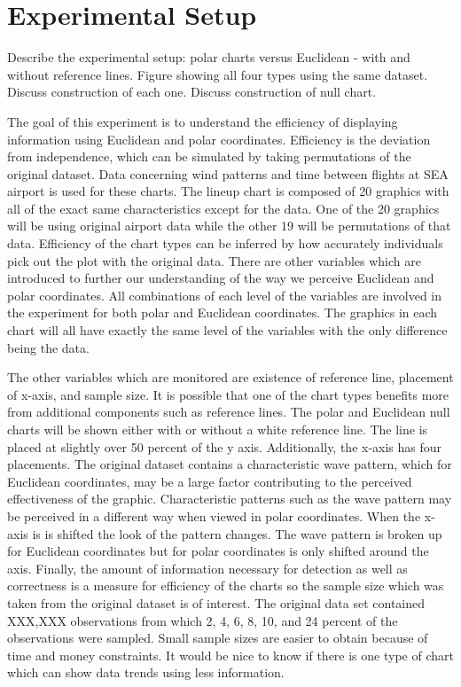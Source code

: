 \section{Experimental Setup}
Describe the experimental setup: polar charts versus Euclidean - with and without reference lines.
Figure showing all four types using the same dataset. 
Discuss construction of each one. Discuss construction of null chart.

The goal of this experiment is to understand the efficiency of displaying information using Euclidean and polar coordinates. Efficiency is the deviation from independence, which can be simulated by taking permutations of the original dataset. Data concerning wind patterns and time between flights at SEA airport is used for these charts. The lineup chart is composed of 20 graphics with all of the exact same characteristics except for the data. One of the 20 graphics will be using original airport data while the other 19 will be permutations of that data. Efficiency of the chart types can be inferred by how accurately individuals pick out the plot with the original data. There are other variables which are introduced to further our understanding of the way we perceive Euclidean and polar coordinates. All combinations of each level of the variables are involved in the experiment for both polar and Euclidean coordinates. The graphics in each chart will all have exactly the same level of the variables with the only difference being the data. 

The other variables which are monitored are existence of reference line, placement of x-axis, and sample size. It is possible that one of the chart types benefits more from additional components such as reference lines. The polar and Euclidean null charts will be shown either with or without a white reference line. The line is placed at slightly over 50 percent of the y axis. Additionally, the x-axis has four placements. The original dataset contains a characteristic wave pattern, which for Euclidean coordinates, may be a large factor contributing to the perceived effectiveness of the graphic. Characteristic patterns such as the wave pattern may be perceived in a different way when viewed in polar coordinates. When the x-axis is is shifted the look of the pattern changes. The wave pattern is broken up for Euclidean coordinates but for polar coordinates is only shifted around the axis. Finally, the amount of information necessary for detection as well as correctness is a measure for efficiency of the charts so the sample size which was taken from the original dataset is of interest. The original data set contained XXX,XXX observations from which 2, 4, 6, 8, 10, and 24 percent of the observations were sampled. Small sample sizes are easier to obtain because of time and money constraints. It would be nice to know if there is one type of chart which can show data trends using less information. 


